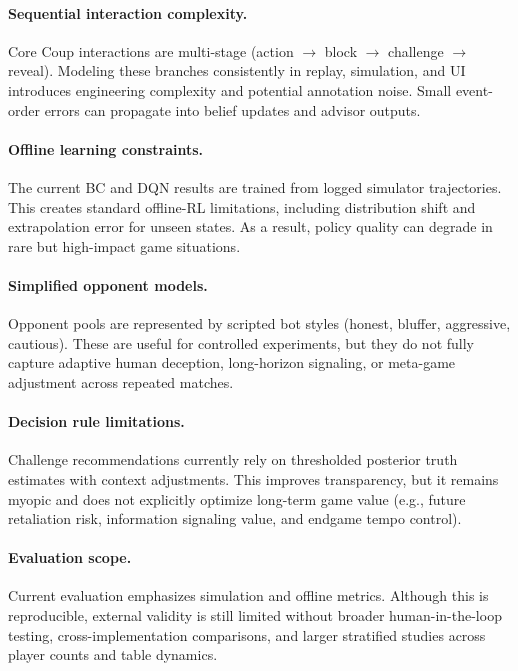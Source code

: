 \documentclass[11pt]{article}
\begin{document}
\paragraph{Sequential interaction complexity.}
Core Coup interactions are multi-stage (action $\rightarrow$ block $\rightarrow$ challenge $\rightarrow$ reveal). Modeling these branches consistently in replay, simulation, and UI introduces engineering complexity and potential annotation noise. Small event-order errors can propagate into belief updates and advisor outputs.

\paragraph{Offline learning constraints.}
The current BC and DQN results are trained from logged simulator trajectories. This creates standard offline-RL limitations, including distribution shift and extrapolation error for unseen states. As a result, policy quality can degrade in rare but high-impact game situations.

\paragraph{Simplified opponent models.}
Opponent pools are represented by scripted bot styles (honest, bluffer, aggressive, cautious). These are useful for controlled experiments, but they do not fully capture adaptive human deception, long-horizon signaling, or meta-game adjustment across repeated matches.

\paragraph{Decision rule limitations.}
Challenge recommendations currently rely on thresholded posterior truth estimates with context adjustments. This improves transparency, but it remains myopic and does not explicitly optimize long-term game value (e.g., future retaliation risk, information signaling value, and endgame tempo control).

\paragraph{Evaluation scope.}
Current evaluation emphasizes simulation and offline metrics. Although this is reproducible, external validity is still limited without broader human-in-the-loop testing, cross-implementation comparisons, and larger stratified studies across player counts and table dynamics.
\end{document}
